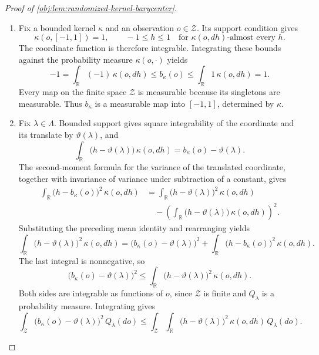 \documentclass[11pt]{article}
\begin{document}
\begin{proof}[Proof of \cref{obj:lem:randomized-kernel-barycenter}]
\begin{enumerate}
\item Fix a bounded kernel \(\kappa\) and an observation \(o\in\mathcal Z\). Its support condition gives
\[
\kappa(o,[-1,1])=1,
\qquad
-1\le h\le 1
\quad\text{for }\kappa(o,dh)\text{-almost every }h.
\]
The coordinate function is therefore integrable. Integrating these bounds against the probability measure \(\kappa(o,\cdot)\) yields
\[
-1=\int_{\mathbb R}(-1)\,\kappa(o,dh)
\le b_\kappa(o)
\le \int_{\mathbb R}1\,\kappa(o,dh)=1.
\]
Every map on the finite space \(\mathcal Z\) is measurable because its singletons are measurable. Thus \(b_\kappa\) is a measurable map into \([-1,1]\), determined by \(\kappa\). %

\item Fix \(\lambda\in\Lambda\). Bounded support gives square integrability of the coordinate and its translate by \(\vartheta(\lambda)\), and
\[
\int_{\mathbb R}\bigl(h-\vartheta(\lambda)\bigr)\,\kappa(o,dh)
=b_\kappa(o)-\vartheta(\lambda).
\]
The second-moment formula for the variance of the translated coordinate, together with invariance of variance under subtraction of a constant, gives
\[
\begin{aligned}
\int_{\mathbb R}\bigl(h-b_\kappa(o)\bigr)^2\,\kappa(o,dh)
&=
\int_{\mathbb R}\bigl(h-\vartheta(\lambda)\bigr)^2\,\kappa(o,dh)\\
&\quad-
\left(
\int_{\mathbb R}\bigl(h-\vartheta(\lambda)\bigr)\,\kappa(o,dh)
\right)^2.
\end{aligned}
\]
Substituting the preceding mean identity and rearranging yields
\[
\int_{\mathbb R}\bigl(h-\vartheta(\lambda)\bigr)^2\,\kappa(o,dh)
=
\bigl(b_\kappa(o)-\vartheta(\lambda)\bigr)^2
+
\int_{\mathbb R}\bigl(h-b_\kappa(o)\bigr)^2\,\kappa(o,dh).
\]
The last integral is nonnegative, so
\[
\bigl(b_\kappa(o)-\vartheta(\lambda)\bigr)^2
\le
\int_{\mathbb R}\bigl(h-\vartheta(\lambda)\bigr)^2\,\kappa(o,dh).
\]
Both sides are integrable as functions of \(o\), since \(\mathcal Z\) is finite and \(Q_\lambda\) is a probability measure. Integrating gives
\[
\int_{\mathcal Z}\bigl(b_\kappa(o)-\vartheta(\lambda)\bigr)^2\,Q_\lambda(do)
\le
\int_{\mathcal Z}\int_{\mathbb R}
\bigl(h-\vartheta(\lambda)\bigr)^2\,\kappa(o,dh)\,Q_\lambda(do).
\]


\end{enumerate}
\end{proof}
\end{document}
